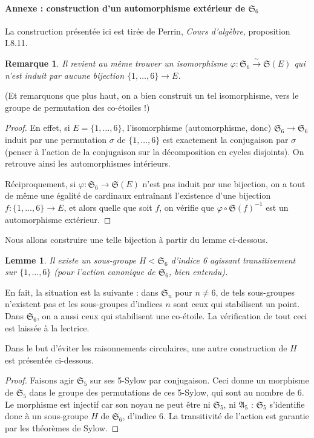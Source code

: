 \documentclass[a4paper, 11pt]{article}
\def\Sigmap{\mathfrak{S}}
\newtheorem*{lemma}{Lemme}
\newtheorem*{remark}{Remarque}
\begin{document}
\paragraph{Annexe : construction d'un automorphisme extérieur de $\Sigmap_6$} La
construction présentée ici est tirée de Perrin, \emph{Cours d'algèbre},
proposition I.8.11.

\begin{remark}
  Il revient au même trouver un isomorphisme $\varphi : \Sigmap_6
  \xrightarrow{\sim} \Sigmap(E)$ qui n'est induit par aucune bijection
  $\{1,\ldots,6\} \to E$.
\end{remark}
(Et remarquons que plus haut, on a bien construit un tel isomorphisme, vers le
groupe de permutation des co-étoiles !)
\begin{proof}
  En effet, si $E = \{1,\ldots,6\}$, l'isomorphisme (automorphisme, donc)
  $\Sigmap_6 \to \Sigmap_6$ induit par une permutation $\sigma$ de
  $\{1,\ldots,6\}$ est exactement la conjugaison par $\sigma$ (penser à l'action
  de la conjugaison sur la décomposition en cycles disjoints). On retrouve ainsi
  les automorphismes intérieurs.

  Réciproquement, si $\varphi : \Sigmap_6 \to \Sigmap(E)$ n'est pas induit par une
  bijection, on a tout de même une égalité de cardinaux entraînant l'existence
  d'une bijection $f : \{1,\ldots,6\} \to E$, et alors quelle que soit $f$, on
  vérifie que $\varphi \circ \Sigmap(f)^{-1}$ est un automorphisme extérieur.
\end{proof}

Nous allons construire une telle bijection à partir du lemme ci-dessous.

\begin{lemma}
  Il existe un sous-groupe $H < \Sigmap_6$ d'indice 6 agissant transitivement
  sur $\{1,\ldots,6\}$ (pour l'action canonique de $\Sigmap_6$, bien entendu).
\end{lemma}
En fait, la situation est la suivante : dans $\Sigmap_n$ pour $n \neq 6$, de
tels sous-groupes n'existent pas et les sous-groupes d'indices $n$ sont ceux qui
stabilisent un point. Dans $\Sigmap_6$, on a aussi ceux qui stabilisent une
co-étoile. La vérification de tout ceci est laissée à la lectrice.

Dans le but d'éviter les raisonnements circulaires, une autre construction de
$H$ est présentée ci-dessous.
\begin{proof}
  Faisons agir $\Sigmap_5$ sur ses 5-Sylow par conjugaison. Ceci donne un
  morphisme de $\Sigmap_5$ dans le groupe des permutations de ces 5-Sylow, qui
  sont au nombre de 6. Le morphisme est injectif car son noyau ne peut être ni
  $\Sigmap_5$, ni $\mathfrak{A}_5$ : $\Sigmap_5$ s'identifie donc à un
  sous-groupe $H$ de $\Sigmap_6$, d'indice 6. La transitivité de l'action est
  garantie par les théorèmes de Sylow.
\end{proof}
\end{document}
